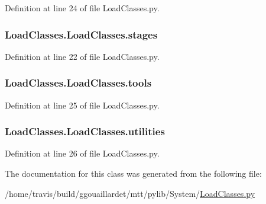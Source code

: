 Definition at line 24 of file Load\-Classes.\-py.

\hypertarget{classLoadClasses_1_1LoadClasses_aca4663cc6002ec1139e8b07f15aa1006}{
\subsubsection[{stages}]{\setlength{\rightskip}{0pt plus 5cm}Load\-Classes.\-Load\-Classes.\-stages}}\label{classLoadClasses_1_1LoadClasses_aca4663cc6002ec1139e8b07f15aa1006}


Definition at line 22 of file Load\-Classes.\-py.

\hypertarget{classLoadClasses_1_1LoadClasses_acea1357ee5b059c0c010c62d9dcdfd42}{
\subsubsection[{tools}]{\setlength{\rightskip}{0pt plus 5cm}Load\-Classes.\-Load\-Classes.\-tools}}\label{classLoadClasses_1_1LoadClasses_acea1357ee5b059c0c010c62d9dcdfd42}


Definition at line 25 of file Load\-Classes.\-py.

\hypertarget{classLoadClasses_1_1LoadClasses_a9bc5a2e86aee8dffd444ea68bc9258de}{
\subsubsection[{utilities}]{\setlength{\rightskip}{0pt plus 5cm}Load\-Classes.\-Load\-Classes.\-utilities}}\label{classLoadClasses_1_1LoadClasses_a9bc5a2e86aee8dffd444ea68bc9258de}


Definition at line 26 of file Load\-Classes.\-py.



The documentation for this class was generated from the following file\-:\begin{DoxyCompactItemize}
\item 
/home/travis/build/ggouaillardet/mtt/pylib/\-System/\hyperlink{LoadClasses_8py}{Load\-Classes.\-py}\end{DoxyCompactItemize}
